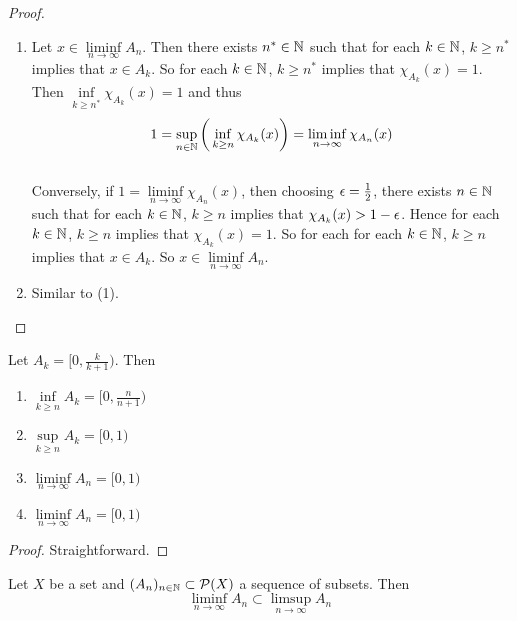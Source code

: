\documentclass{book}
\begin{document}
	\begin{proof}\
		\begin{enumerate}
			\item Let $x \in \liminf\limits_{n \rightarrow \infty}A_n$. Then there exists $n^* \in \mathbb{N}$ such that for each $k \in \mathbb{N}$, $k \geq n^*$ implies that $x \in A_k$. So for each $k \in \mathbb{N}$, $k \geq n^*$ implies that $\chi_{A_k}(x) = 1$. Then $\inf\limits_{k \geq n^*}\chi_{A_k}(x) = 1$ and thus $$1 = \sup\limits_{n \in \mathbb{N}} \bigg(\inf\limits_{k \geq n} \chi_{A_k}(x) \bigg) = \liminf_{n \rightarrow \infty}\chi_{A_n}(x)$$ \vspace{3mm} \\
			Conversely, if $1 = \liminf\limits_{n \rightarrow \infty}\chi_{A_n}(x)$, then choosing $\epsilon = \frac{1}{2}$, there exists $n \in \mathbb{N}$ such that for each $k \in \mathbb{N}$, $k \geq n$ implies that $\chi_{A_k}(x) > 1-\epsilon$. Hence for each $k \in \mathbb{N}$, $k \geq n$ implies that $\chi_{A_k}(x) = 1$. So for each for each $k \in \mathbb{N}$, $k \geq n$ implies that $x \in A_k$. So $x \in \liminf\limits_{n \rightarrow \infty} A_n$. 
			\item Similar to (1).
		\end{enumerate}
	\end{proof}
	
	\begin{ex}  
		Let $A_k = [0, \frac{k}{k+1})$. Then 
		\begin{enumerate}
			\item $\inf\limits_{k \geq n}A_k = [0, \frac{n}{n+1})$ \\
			\item $\sup\limits_{k \geq n}A_k = [0,1)$ \\
			\item $\liminf\limits_{n \rightarrow \infty}A_n = [0,1)$ \\
			\item $\liminf\limits_{n \rightarrow \infty}A_n = [0,1)$
		\end{enumerate}
	\end{ex}
	
	\begin{proof}
		Straightforward.
	\end{proof}
	
	\begin{ex}  
		Let $X$ be a set and $(A_n)_{n \in \mathbb{N}} \subset \mathcal{P}(X)$ a sequence of subsets. Then $$\liminf_{n \rightarrow \infty} A_n \subset \limsup_{n \rightarrow \infty} A_n$$
	\end{ex}
	
\end{document}
